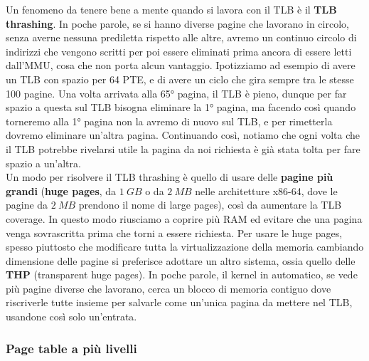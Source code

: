 \documentclass[11pt, a4paper, titlepage, oneside]{scrbook}
\begin{document}
Un fenomeno da tenere bene a mente quando si lavora con il TLB è il \textbf{TLB thrashing}. In poche parole, se si hanno diverse pagine che lavorano in circolo, senza averne nessuna prediletta rispetto alle altre, avremo un continuo circolo di indirizzi che vengono scritti per poi essere eliminati prima ancora di essere letti dall'MMU, cosa che non porta alcun vantaggio. Ipotizziamo ad esempio di avere un TLB con spazio per 64 PTE, e di avere un ciclo che gira sempre tra le stesse 100 pagine. Una volta arrivata alla 65° pagina, il TLB è pieno, dunque per far spazio a questa sul TLB bisogna eliminare la 1° pagina, ma facendo così quando torneremo alla 1° pagina non la avremo di nuovo sul TLB, e per rimetterla dovremo eliminare un'altra pagina. Continuando così, notiamo che ogni volta che il TLB potrebbe rivelarsi utile la pagina da noi richiesta è già stata tolta per fare spazio a un'altra. \\
Un modo per risolvere il TLB thrashing è quello di usare delle \textbf{pagine più grandi} (\textbf{huge pages}, da $\SI{1}{GB}$ o da $\SI{2}{MB}$ nelle architetture x86-64, dove le pagine da $\SI{2}{MB}$ prendono il nome di large pages), così da aumentare la TLB coverage. In questo modo riusciamo a coprire più RAM ed evitare che una pagina venga sovrascritta prima che torni a essere richiesta. Per usare le huge pages, spesso piuttosto che modificare tutta la virtualizzazione della memoria cambiando dimensione delle pagine si preferisce adottare un altro sistema, ossia quello delle \textbf{THP} (transparent huge pages). In poche parole, il kernel in automatico, se vede più pagine diverse che lavorano, cerca un blocco di memoria contiguo dove riscriverle tutte insieme per salvarle come un'unica pagina da mettere nel TLB, usandone così solo un'entrata.

\subsubsection*{Page table a più livelli}
\end{document}
